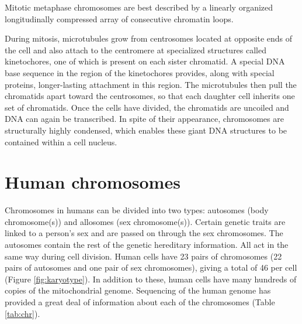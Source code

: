 Mitotic metaphase chromosomes are best described by a linearly organized longitudinally compressed array of consecutive chromatin loops.

During mitosis, microtubules grow from centrosomes located at opposite ends of the cell and also attach to the centromere at specialized structures called kinetochores, one of which is present on each sister chromatid. A special DNA base sequence in the region of the kinetochores provides, along with special proteins, longer-lasting attachment in this region. The microtubules then pull the chromatids apart toward the centrosomes, so that each daughter cell inherits one set of chromatids. Once the cells have divided, the chromatids are uncoiled and DNA can again be transcribed. In spite of their appearance, chromosomes are structurally highly condensed, which enables these giant DNA structures to be contained within a cell nucleus.

\hypertarget{human-chromosomes}{%
\section{Human chromosomes}\label{human-chromosomes}}

Chromosomes in humans can be divided into two types: autosomes (body chromosome(s)) and allosomes (sex chromosome(s)). Certain genetic traits are linked to a person's sex and are passed on through the sex chromosomes. The autosomes contain the rest of the genetic hereditary information. All act in the same way during cell division. Human cells have 23 pairs of chromosomes (22 pairs of autosomes and one pair of sex chromosomes), giving a total of 46 per cell (Figure \ref{fig:karyotype}). In addition to these, human cells have many hundreds of copies of the mitochondrial genome. Sequencing of the human genome has provided a great deal of information about each of the chromosomes (Table \ref{tab:chr}).

